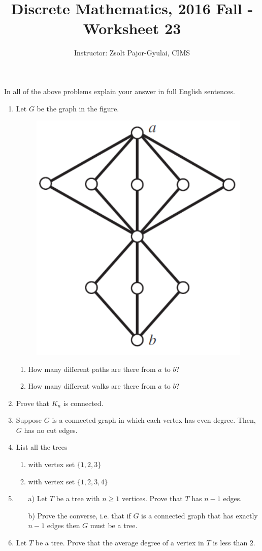 \documentclass[11pt]{preprint}
\title{Discrete Mathematics, 2016 Fall - Worksheet 23}
\author{Instructor: Zsolt Pajor-Gyulai, CIMS}
\def\enumb{\begin{enumerate}}
\def\enume{\end{enumerate}}
\begin{document}
\maketitle

In all of the above problems explain your answer in full English sentences.

\enumb
\item Let $G$ be the graph in the figure.
\begin{figure}[ht]
\centering
\includegraphics[scale=0.3]{WS1.pdf}
\end{figure}
\enumb
\item How many different paths are there from $a$ to $b$?
\item How many different walks are there from $a$ to $b$?
\enume
\item Prove that $K_n$ is connected.
\item Suppose $G$ is a connected graph in which each vertex has even degree. Then, $G$ has no cut edges.
\item List all the trees
\enumb
\item with vertex set $\{1,2,3\}$
\item with vertex set $\{1,2,3,4\}$
\enume
\item 
\begin{enumerate}
\item[a)] Let $T$ be a tree with $n\geq 1$ vertices. Prove that $T$ has $n-1$ edges.


\item[b)] Prove the converse, i.e. that if $G$ is a connected graph that has exactly $n-1$ edges then $G$ must be a tree.


\end{enumerate}
\item Let $T$ be a tree. Prove that the average degree of a vertex in $T$ is less than $2$.



\enume
\end{document}
